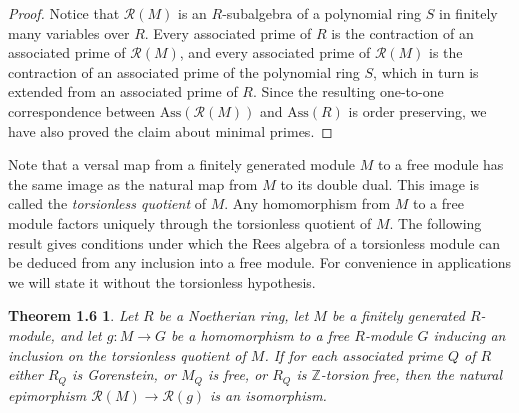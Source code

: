 \documentclass{proc-l}
\theoremstyle{plain}
\newtheorem*{theorem5}{Theorem 1.6}
\theoremstyle{definition}
\newcommand{\R}{\mathcal R}
\begin{document}
\begin{proof} Notice that $\R (M)$ is an $R$-subalgebra of a
polynomial ring $S$ in finitely many variables over $R$. Every
associated prime of $R$ is the contraction of an associated prime
of $\R (M)$, and every associated prime of $\R (M)$ is the
contraction of an associated prime of the polynomial ring $S$,
which in turn is extended from an associated prime of $R$. Since
the resulting one-to-one correspondence between $\text{Ass}(\R (M))$ and
$\text{Ass}(R)$ is order preserving, we have also proved
the claim about minimal primes.   \end{proof}


\smallskip Note that a versal map from a finitely generated module 
$M$ to a free module has the same
image as the natural map from $M$ to its double dual. This image
is called the {\em torsionless quotient\/} of $M$. Any homomorphism from
$M$ to a free module factors uniquely through the torsionless
quotient of $M$. The following result gives conditions under which the Rees
algebra of a torsionless module can be deduced from any inclusion
into a free module. For convenience in applications we will state
it without the torsionless hypothesis. 

\begin{theorem5}  Let $R$ be a Noetherian ring, let $M$ be a
finitely generated $R$-module, and let $g \colon M \to G$ be a 
homomorphism to
a free $R$-module $G$ inducing an inclusion on the torsionless
quotient of $M$. If for
each associated prime $Q$ of $R$ either $R_{Q}$ is Gorenstein,  or 
$M_{Q}$ is free, or $R_{Q}$ is ${\mathbb{Z}}$-torsion free, then the
natural epimorphism $\R (M) \to \R (g)$ is an isomorphism.
\end{theorem5}
\end{document}
